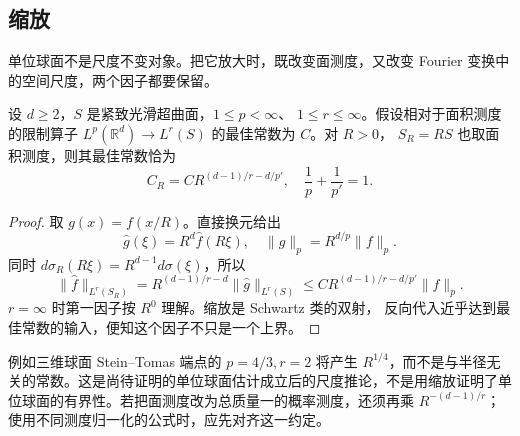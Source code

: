 \subsection{缩放}
\label{b2:subsec:230104}

单位球面不是尺度不变对象。把它放大时，既改变面测度，又改变 Fourier 变换中的空间尺度，两个因子都要保留。

\begin{proposition}[曲面半径的缩放]\label{b2:prop:23-surface-scaling}
设 \(d\geq2\)，\(S\) 是紧致光滑超曲面，\(1\leq p<\infty\)、
\(1\leq r\leq\infty\)。假设相对于面积测度的限制算子
\(L^p(\mathbb R^d)\to L^r(S)\) 的最佳常数为 \(C\)。对 \(R>0\)，
\(S_R=RS\) 也取面积测度，则其最佳常数恰为
\[
 C_R=C R^{(d-1)/r-d/p'},
 \quad \frac1p+\frac1{p'}=1.
\]
\end{proposition}
\begin{proof}
取 \(g(x)=f(x/R)\)。直接换元给出
\[
 \widehat g(\xi)=R^d\widehat f(R\xi),
 \quad \|g\|_p=R^{d/p}\|f\|_p.
\]
同时 \(d\sigma_R(R\xi)=R^{d-1}d\sigma(\xi)\)，所以
\[
 \|\widehat f\|_{L^r(S_R)}
 =R^{(d-1)/r-d}\|\widehat g\|_{L^r(S)}
 \leq C R^{(d-1)/r-d/p'}\|f\|_p.
\]
\(r=\infty\) 时第一因子按 \(R^0\) 理解。缩放是 Schwartz 类的双射，
反向代入近乎达到最佳常数的输入，便知这个因子不只是一个上界。
\end{proof}

例如三维球面 Stein–Tomas 端点的 \(p=4/3,r=2\) 将产生
\(R^{1/4}\)，而不是与半径无关的常数。这是尚待证明的单位球面估计成立后的尺度推论，不是用缩放证明了单位球面的有界性。若把面测度改为总质量一的概率测度，还须再乘
\(R^{-(d-1)/r}\)；使用不同测度归一化的公式时，应先对齐这一约定。
